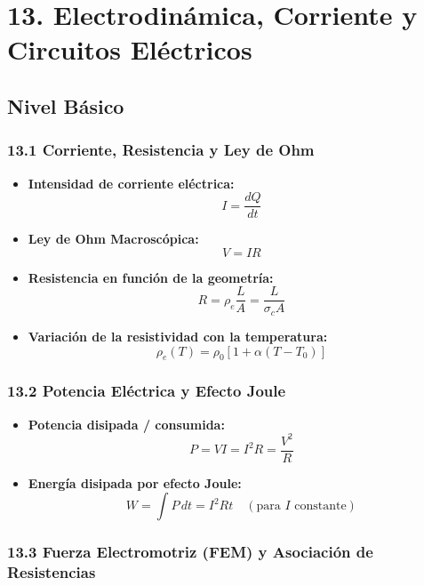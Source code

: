 \documentclass[11pt,a4paper]{article}
\begin{document}
\section*{13. Electrodinámica, Corriente y Circuitos Eléctricos}

\subsection*{Nivel Básico}

\subsubsection*{13.1 Corriente, Resistencia y Ley de Ohm}

\begin{itemize}
  \item \textbf{Intensidad de corriente eléctrica:}
  \[
    I = \frac{dQ}{dt}
  \]
  \item \textbf{Ley de Ohm Macroscópica:}
  \[
    V = I R
  \]
  \item \textbf{Resistencia en función de la geometría:}
  \[
    R = \rho_e \frac{L}{A} = \frac{L}{\sigma_c A}
  \]
  \item \textbf{Variación de la resistividad con la temperatura:}
  \[
    \rho_e(T) = \rho_0 [1 + \alpha (T - T_0)]
  \]
\end{itemize}

\subsubsection*{13.2 Potencia Eléctrica y Efecto Joule}

\begin{itemize}
  \item \textbf{Potencia disipada / consumida:}
  \[
    P = V I = I^2 R = \frac{V^2}{R}
  \]
  \item \textbf{Energía disipada por efecto Joule:}
  \[
    W = \int P \, dt = I^2 R t \quad (\text{para } I \text{ constante})
  \]
\end{itemize}

\subsubsection*{13.3 Fuerza Electromotriz (FEM) y Asociación de Resistencias}
\end{document}
